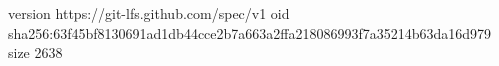 version https://git-lfs.github.com/spec/v1
oid sha256:63f45bf8130691ad1db44cce2b7a663a2ffa218086993f7a35214b63da16d979
size 2638
